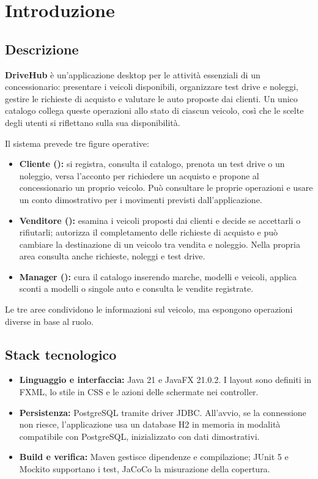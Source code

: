 \chapter{Introduzione}\label{ch:introduzione}

\section{Descrizione}
\textbf{DriveHub} è un'applicazione desktop per le attività essenziali di un concessionario: presentare i veicoli disponibili, organizzare test drive e noleggi, gestire le richieste di acquisto e valutare le auto proposte dai clienti. Un unico catalogo collega queste operazioni allo stato di ciascun veicolo, così che le scelte degli utenti si riflettano sulla sua disponibilità.

Il sistema prevede tre figure operative:
\begin{itemize}
  \item \textbf{Cliente ():} si registra, consulta il catalogo, prenota un test drive o un noleggio, versa l'acconto per richiedere un acquisto e propone al concessionario un proprio veicolo. Può consultare le proprie operazioni e usare un conto dimostrativo per i movimenti previsti dall'applicazione.
  \item \textbf{Venditore ():} esamina i veicoli proposti dai clienti e decide se accettarli o rifiutarli; autorizza il completamento delle richieste di acquisto e può cambiare la destinazione di un veicolo tra vendita e noleggio. Nella propria area consulta anche richieste, noleggi e test drive.
  \item \textbf{Manager ():} cura il catalogo inserendo marche, modelli e veicoli, applica sconti a modelli o singole auto e consulta le vendite registrate.
\end{itemize}

Le tre aree condividono le informazioni sul veicolo, ma espongono operazioni diverse in base al ruolo.

\section{Stack tecnologico}
\begin{itemize}
  \item \textbf{Linguaggio e interfaccia:} Java 21 e JavaFX 21.0.2. I layout sono definiti in FXML, lo stile in CSS e le azioni delle schermate nei controller.
  \item \textbf{Persistenza:} PostgreSQL tramite driver JDBC. All'avvio, se la connessione non riesce, l'applicazione usa un database H2 in memoria in modalità compatibile con PostgreSQL, inizializzato con dati dimostrativi.
  \item \textbf{Build e verifica:} Maven gestisce dipendenze e compilazione; JUnit 5 e Mockito supportano i test, JaCoCo la misurazione della copertura.
\end{itemize}

